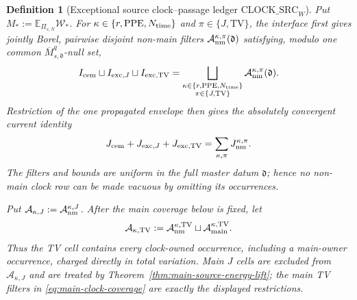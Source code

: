 \documentclass[11pt]{article}
\newtheorem{definition}[theorem]{Definition}
\begin{document}
\begin{definition}[Exceptional source clock--passage ledger
$\mathrm{CLOCK\_SRC}_{W}$]
\label{def:source-clock-matrix}
Put $M_*:=\mathbb E_{\Pi_{s,N}}\mathscr W_*$.  For
$\kappa\in\{r,\mathrm{PPE},N_{\rm time}\}$ and
$\pi\in\{J,\mathrm{TV}\}$, the interface first gives jointly Borel,
pairwise disjoint non-main filters
$\mathcal A_{\rm nm}^{\kappa,\pi}(\mathfrak d)$ satisfying, modulo one
common $\overline M_{s,\mathfrak d}^{q}$-null set,
\begin{equation}
\label{eq:nonmain-clock-coverage}
 I_{\rm cem}\sqcup I_{{\rm exc},J}\sqcup I_{{\rm exc},\rm TV}
 =\bigsqcup_{\substack{
       \kappa\in\{r,{\rm PPE},N_{\rm time}\}\\
       \pi\in\{J,{\rm TV}\}}}
       \mathcal A_{\rm nm}^{\kappa,\pi}(\mathfrak d).
\end{equation}
Restriction of the one propagated envelope then gives the absolutely
convergent current identity
\begin{equation}
\label{eq:nonmain-clock-current-identity}
 J_{\rm cem}+J_{{\rm exc},J}+J_{{\rm exc},\rm TV}
 =\sum_{\kappa,\pi}J_{\rm nm}^{\kappa,\pi}.
\end{equation}
The filters and bounds are uniform in the full master datum
$\mathfrak d$; hence no non-main clock row can be made vacuous by omitting
its occurrences.

Put $\mathcal A_{\kappa,J}:=\mathcal A_{\rm nm}^{\kappa,J}$.
After the main coverage below is fixed, let
\[
 \mathcal A_{\kappa,\rm TV}:=
 \mathcal A_{\rm nm}^{\kappa,\rm TV}
 \sqcup\mathcal A_{\rm main}^{\kappa,\rm TV}.
\]
Thus the TV cell contains \emph{every} clock-owned occurrence, including a
main-owner occurrence, charged directly in total variation.  Main $J$ cells
are excluded from $\mathcal A_{\kappa,J}$ and are treated by
Theorem~\ref{thm:main-source-energy-lift}; the main TV filters in
\eqref{eq:main-clock-coverage} are exactly the displayed restrictions.


\end{definition}
\end{document}
